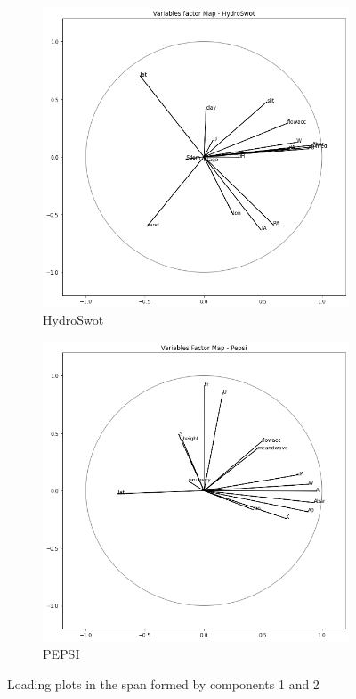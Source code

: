 \begin{figure}[H]
    \centering
    \begin{subfigure}{0.45\textwidth}
        \centering
        \includegraphics[scale=0.28]{Graph/factor_map_hydro.png}
        \caption{HydroSwot}
        \label{subfig:fmh}
    \end{subfigure}
    \begin{subfigure}{0.45\textwidth}
        \centering
        \includegraphics[scale=0.28]{Graph/factor_map_pepsi.png}
        \caption{PEPSI}
        \label{subfig:fmp}
    \end{subfigure}
\caption{Loading plots in the span formed by components 1 and 2}
\label{fig:factormap}
\end{figure}

